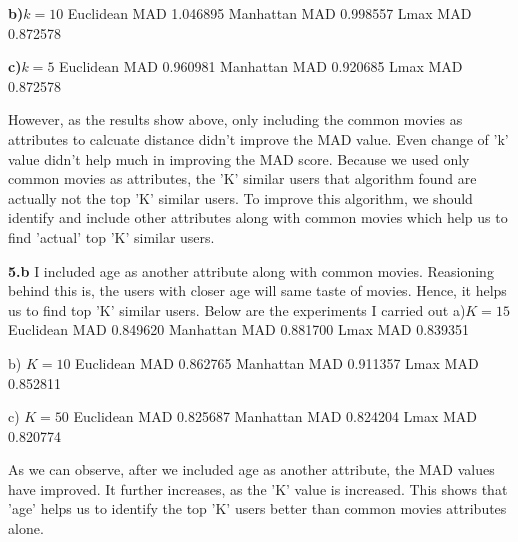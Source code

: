 \documentclass{article}
\begin{document}
\textbf{b)}$k=10$\newline
Euclidean MAD 1.046895\newline
Manhattan MAD 0.998557\newline
Lmax MAD 0.872578\newline

\textbf{c)}$k=5$\newline
Euclidean MAD 0.960981\newline
Manhattan MAD 0.920685\newline
Lmax MAD 0.872578\newline

However, as the results show above, only including the common movies as attributes to calcuate distance didn't improve the MAD value. Even change of 'k' value didn't help much in improving the MAD score. Because we used only common movies as attributes, the 'K' similar users that algorithm found are actually not the top 'K' similar users. To improve this algorithm, we should identify and include other attributes along with common movies which help us to find 'actual' top 'K' similar users.\newline  


\textbf{5.b}\newline
I included age as another attribute along with common movies. Reasioning behind this is, the users with closer age will same taste of movies. Hence, it helps us to find top 'K' similar users. Below are the experiments I carried out\newline
a)$K=15$\newline
Euclidean MAD 0.849620\newline
Manhattan MAD 0.881700\newline
Lmax MAD 0.839351\newline

b) $K=10$\newline
Euclidean MAD 0.862765\newline
Manhattan MAD 0.911357\newline
Lmax MAD 0.852811\newline

c) $K=50$\newline
Euclidean MAD 0.825687\newline
Manhattan MAD 0.824204\newline
Lmax MAD 0.820774\newline


As we can observe, after we included age as another attribute, the MAD values have improved. It further increases, as the 'K' value is increased. This shows that 'age' helps us to identify the top 'K' users better than common movies attributes alone.\newline
\end{document}
